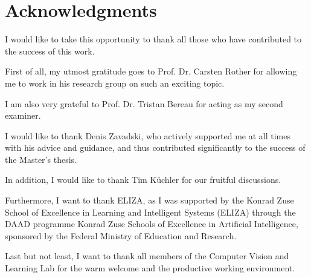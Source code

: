 \chapter{Acknowledgments}

I would like to take this opportunity to thank all those who have contributed to the success of this work. 

First of all, my utmost gratitude goes to Prof. Dr. Carsten Rother for allowing me to work in his research group on such an exciting topic. 

I am also very grateful to Prof. Dr. Tristan Bereau for acting as my second examiner.

I would like to thank Denis Zavadski, who actively supported me at all times with his advice and guidance, and thus contributed significantly to the success of the Master's thesis. 

In addition, I would like to thank Tim Küchler for our fruitful discussions.

Furthermore, I want to thank ELIZA, as I was supported by the Konrad Zuse School of Excellence in
Learning and Intelligent Systems (ELIZA) through the DAAD programme
Konrad Zuse Schools of Excellence in Artificial Intelligence, sponsored by the
Federal Ministry of Education and Research.

Last but not least, I want to thank all members of the Computer Vision and Learning Lab for the warm welcome and the productive working environment.